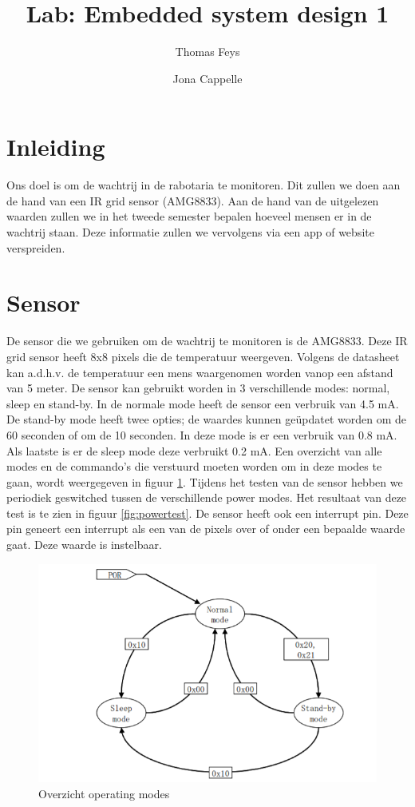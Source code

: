 \documentclass[]{article}
\title{Lab: Embedded system design 1}
\author{Thomas Feys \and Jona Cappelle}
\begin{document}
\maketitle

\newpage

\tableofcontents

\newpage

\section{Inleiding}
Ons doel is om de wachtrij in de rabotaria te monitoren. Dit zullen we doen aan de hand van een IR grid sensor (AMG8833). Aan de hand van de uitgelezen waarden zullen we in het tweede semester bepalen hoeveel mensen er in de wachtrij staan. Deze informatie zullen we vervolgens via een app of website verspreiden.


\section{Sensor}
De sensor die we gebruiken om de wachtrij te monitoren is de AMG8833. Deze IR grid sensor heeft 8x8 pixels die de temperatuur weergeven. Volgens de datasheet kan a.d.h.v. de temperatuur een mens waargenomen worden vanop een afstand van 5 meter. De sensor kan gebruikt worden in 3 verschillende modes: normal, sleep en stand-by. In de normale mode heeft de sensor een verbruik van 4.5 mA. De stand-by mode heeft twee opties; de waardes kunnen geüpdatet worden om de 60 seconden of om de 10 seconden. In deze mode is er een verbruik van 0.8 mA. Als laatste is er de sleep mode deze verbruikt 0.2 mA. Een overzicht van alle modes en de commando's die verstuurd moeten worden om in deze modes te gaan, wordt weergegeven in figuur \ref{fig:operatingmodes}. Tijdens het testen van de sensor hebben we periodiek geswitched tussen de verschillende power modes. Het resultaat van deze test is te zien in figuur \ref{fig:powertest}. De sensor heeft ook een interrupt pin. Deze pin geneert een interrupt als een van de pixels over of onder een bepaalde waarde gaat. Deze waarde is instelbaar.	
\begin{figure}[!ht]
	\centering
	\includegraphics[width=\columnwidth]{operatingmodes.png}
	\caption{Overzicht operating modes}
	\label{fig:operatingmodes}
\end{figure}
\end{document}
